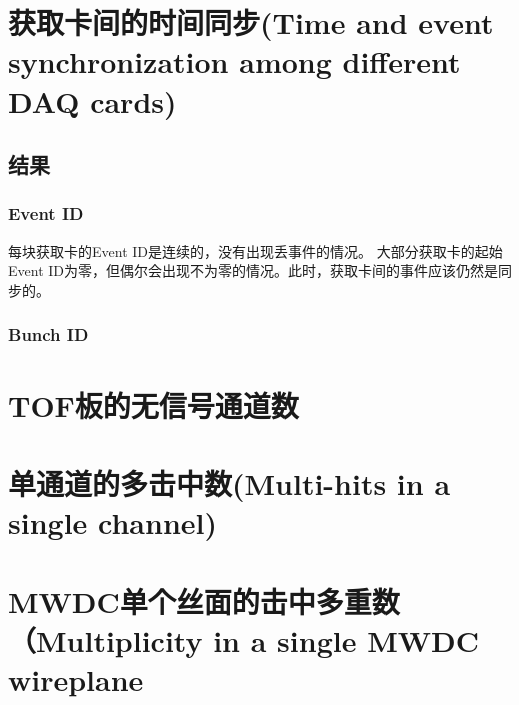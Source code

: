 \section{获取卡间的时间同步(Time and event synchronization among different DAQ cards)}
\subsection{结果}
\subsubsection*{Event ID}
每块获取卡的Event ID是连续的，没有出现丢事件的情况。
大部分获取卡的起始Event ID为零，但偶尔会出现不为零的情况。此时，获取卡间的事件应该仍然是同步的。

\subsubsection*{Bunch ID}

\section{TOF板的无信号通道数}

\section{单通道的多击中数(Multi-hits in a single channel)}

\section{MWDC单个丝面的击中多重数（Multiplicity in a single MWDC wireplane}